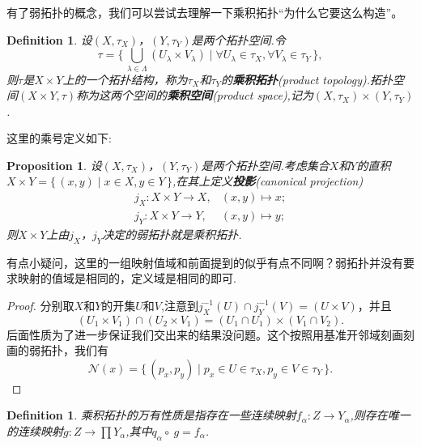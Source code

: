 \documentclass{article}
\newtheorem{proposition}[theorem]{Proposition}
\newtheorem{definition}[theorem]{Definition}
\newcommand*{\xfunc}[4]{{#2}\colon{#3}{#1}{#4}}
\newcommand*{\func}[3]{\xfunc{\to}{#1}{#2}{#3}}
\newcommand\Set[2]{\{\,#1\mid#2\,\}} %
\begin{document}
有了弱拓扑的概念，我们可以尝试去理解一下乘积拓扑“为什么它要这么构造”。


\begin{definition}
设$(X,\tau_X)$，$(Y,\tau_Y)$是两个拓扑空间.令\[\tau = \Set{\bigcup\limits_{\lambda \in \Lambda}(U_\lambda \times V_\lambda)}{\forall U_\lambda \in \tau_X, \forall V_\lambda \in \tau_Y},\]则$\tau$是$X \times Y$上的一个拓扑结构，称为$\tau_X$和$\tau_Y$的\textbf{乘积拓扑}(product topology).拓扑空间$(X \times Y,\tau)$称为这两个空间的\textbf{乘积空间}(product space),记为$(X,\tau_X) \times (Y,\tau_Y)$.
\end{definition}


这里的乘号定义如下:

\begin{proposition}
设$(X,\tau_X)$，$(Y,\tau_Y)$是两个拓扑空间.考虑集合$X$和$Y$的直积$X \times Y=\Set{(x,y)}{x \in X,y \in Y}$,在其上定义\textbf{投影}(canonical  projection)\[\begin{aligned}
			\func{j_X}{X \times Y}{X} ,& (x,y) \mapsto x;\\
			\func{j_Y}{X \times Y}{Y} ,& (x,y) \mapsto y; 
			\end{aligned}
			\]则$X \times Y$上由$j_X$，$j_Y$决定的弱拓扑就是乘积拓扑.		
\end{proposition}

有点小疑问，这里的一组映射值域和前面提到的似乎有点不同啊？弱拓扑并没有要求映射的值域是相同的，定义域是相同的即可.

\begin{proof}
分别取$X$和$Y$的开集$U$和$V$,注意到$j_X^{-1}(U) \cap j_Y^{-1}(V)=(U \times V)$，并且\[(U_1 \times V_1) \cap (U_2 \times V_1)=(U_1 \cap U_1)\times (V_1 \cap V_2).\]后面性质为了进一步保证我们交出来的结果没问题。这个按照用基准开邻域刻画刻画的弱拓扑，我们有\[\mathcal{N}(x)=\Set{(p_x,p_y)}{p_x \in U \in \tau_X,p_y \in V \in \tau_Y}.\]
\end{proof}

\begin{definition}
乘积拓扑的万有性质是指存在一些连续映射$\func{f_\alpha}{Z}{Y_\alpha}$,则存在唯一的连续映射$\func{g}{Z}{\prod Y_\alpha}$,其中$q_\alpha \circ \ g = f_\alpha$.
\begin{center}
\end{center}
\end{definition}
\end{document}
